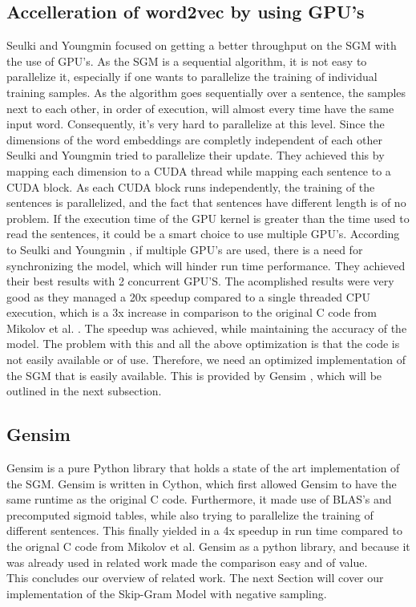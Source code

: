 \subsection{Accelleration of word2vec by using GPU's}
Seulki and Youngmin \cite{gpu} focused on getting a better throughput on the SGM with the use of GPU's. As the SGM is a sequential algorithm, it is not easy to parallelize it, especially if one wants to parallelize the training of individual training samples. As the algorithm goes sequentially over a sentence, the samples next to each other, in order of execution, will almost every time have the same input word. Consequently, it's very hard to parallelize at this level. 
Since the dimensions of the word embeddings are completly independent of each other  Seulki and Youngmin \cite{gpu} tried to parallelize their update. They achieved this by mapping each dimension to a CUDA thread while mapping each sentence to a CUDA block. As each CUDA block runs independently, the training of the sentences is parallelized, and the fact that sentences have different length is of no problem. If the execution time of the GPU kernel is greater than the time used to read the sentences, it could be a smart choice to use multiple GPU's. According to Seulki and Youngmin \cite{gpu}, if multiple GPU's are used, there is a need for synchronizing the model, which will hinder run time performance. They achieved their best results with 2 concurrent GPU'S. The acomplished results were very good as they managed a 20x speedup compared to a single threaded CPU execution, which is a 3x increase in comparison to the original C code from Mikolov et al. \cite{mikolov2}. The speedup was achieved, while maintaining the accuracy of the model. The problem with this and all the above optimization is that the code is not easily available or of use. Therefore, we need an optimized implementation of the SGM that is easily available. This is provided by Gensim \cite{gensim}, which will be outlined in the next subsection.
\subsection{Gensim}\label{ssec:gensim}
Gensim \cite{gensim} is a pure Python library that holds a state of the art implementation of the SGM. Gensim is written in Cython, which first allowed Gensim to have the same runtime as the original C code. Furthermore, it made use of BLAS's and precomputed sigmoid tables, while also trying to parallelize the training of different sentences. This finally yielded in a 4x speedup in run time compared to the orignal C code from Mikolov et al. Gensim as a python library, and because it was already used in related work \cite{intel} made the comparison easy and of value. \\ This concludes our overview of  related work. The next Section will cover our implementation of the Skip-Gram Model with negative sampling.